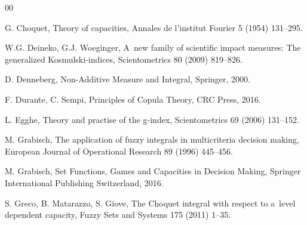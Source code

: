 \documentclass[preprint,11pt]{elsarticle}
\theoremstyle{definition}
\begin{document}
\begin{thebibliography}{00}



 G. Choquet, Theory of capacities, Annales de l'institut Fourier 5 (1954) 131--295.


W.G. Deineko, G.J. Woeginger, A~new family of scientific impact measures:  The generalized Kosmulski-indices, Scientometrics 80  (2009) 819--826.

 D. Denneberg, Non-Additive Measure and Integral, Springer, 2000.

F. Durante, C. Sempi, Principles of Copula Theory, CRC Press, 2016.



 L. Egghe, Theory and practise of the g-index, Scientometrics 69 (2006) 131--152.


 M. Grabisch, The application of fuzzy integrals in multicriteria decision making, European Journal of Operational Research 89 (1996) 445--456.


 M. Grabisch, Set Functions, Games and Capacities in Decision Making,  Springer International Publishing Switzerland, 2016.




 S. Greco, B. Matarazzo, S. Giove, The Choquet integral with respect to a~level dependent capacity, Fuzzy Sets and Systems 175 (2011) 1--35.



\end{thebibliography}
\end{document}
